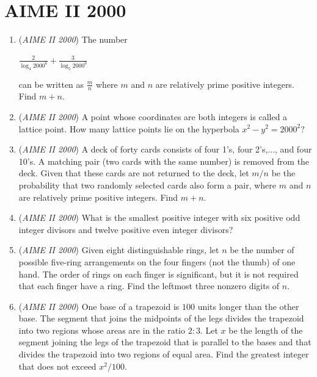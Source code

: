 \section{AIME II 2000}
        \begin{enumerate}
        	\item (\textit{AIME II 2000}) The number


 $\frac 2{\log_4{2000^6}} + \frac 3{\log_5{2000^6}}$

 can be written as $\frac mn$ where $m$ and $n$ are relatively prime positive integers.  Find $m + n$.


 

	\item (\textit{AIME II 2000}) A point whose coordinates are both integers is called a lattice point.  How many lattice points lie on the hyperbola $x^2 - y^2 = 2000^2$?


 

	\item (\textit{AIME II 2000}) A deck of forty cards consists of four 1's, four 2's,..., and four 10's.  A matching pair (two cards with the same number) is removed from the deck.  Given that these cards are not returned to the deck, let $m/n$ be the probability that two randomly selected cards also form a pair, where $m$ and $n$ are relatively prime positive integers.  Find $m + n.$


	\item (\textit{AIME II 2000}) What is the smallest positive integer with six positive odd integer divisors and twelve positive even integer divisors?


 

	\item (\textit{AIME II 2000}) Given eight distinguishable rings, let $n$ be the number of possible five-ring arrangements on the four fingers (not the thumb) of one hand. The order of rings on each finger is significant, but it is not required that each finger have a ring. Find the leftmost three nonzero digits of $n$.


 

	\item (\textit{AIME II 2000}) One base of a trapezoid is $100$ units longer than the other base. The segment that joins the midpoints of the legs divides the trapezoid into two regions whose areas are in the ratio $2: 3$. Let $x$ be the length of the segment joining the legs of the trapezoid that is parallel to the bases and that divides the trapezoid into two regions of equal area. Find the greatest integer that does not exceed $x^2/100$.



\end{enumerate}
